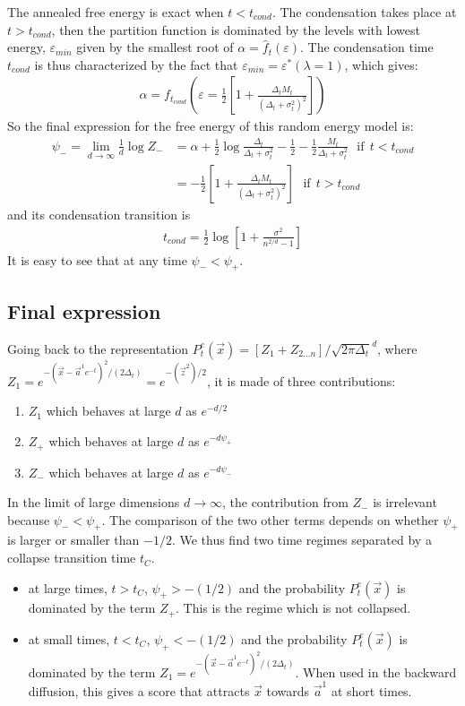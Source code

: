 \documentclass[10pt,twocolumn]{article}
\newcommand{\vx}{\vec x}
\newcommand{\va}{\vec a}
\newcommand{\ve}{{\varepsilon}}
\begin{document}
The annealed free energy is exact when $t<t_{cond}$. The condensation takes place at $t>t_{cond}$, then the partition function is dominated by the levels with lowest energy, $\ve_{min}$ given by the smallest root of 
$\alpha=\hat f_t(\ve)$. The condensation time $t_{cond}$ is  thus characterized by the fact that $\ve_{min}=\ve^*(\lambda=1)$, which gives:
\begin{align}
\alpha=f_{t_{cond}}\left( \ve=
\frac{1}{2} \left[1+\frac{\Delta_t M_t}{(\Delta_t+\sigma_t^2)^2}\right]
\right)
\end{align}
So the final expression for the free energy of this random energy model is:
\begin{align}
\psi_-=\lim_{d\to\infty} \frac{1}{d}\log Z_- &= 
\alpha+\frac{1}{2}\log\frac{\Delta_t}{\Delta_t+\sigma_t^2}-\frac{1}{2}- \frac{1}{2}\frac{M_t}{\Delta_t+\sigma_t^2}
\ \ \  \text{if}\ \  t<t_{cond}\nonumber \\
&= -\frac{1}{2} \left[1+\frac{\Delta_t M_t}{(\Delta_t+\sigma_t^2)^2}\right] \ \ \  \text{if}\ \  t>t_{cond}
\end{align}
and its condensation transition is
\begin{align}
t_{cond}=\frac{1}{2}\log\left[1+\frac{\sigma^2}{n^{2/d}-1}
\right]
\end{align}
It is easy to see that at any time $\psi_-<\psi_+$.

\subsection{Final expression}

Going back to the representation $P_t^e(\vx)= \left[Z_1+Z_{2...n}\right]/\sqrt{2\pi
  \Delta_t}^d$,
  where $Z_1= e^{-(\vx-\va^1 e^{-t})^2/(2\Delta_t)}= e^{-(\vec z^2)/2}  $, it is made of three contributions:
\begin{enumerate}
\item
$Z_1$ which behaves at large $d$ as $e^{-d/2}$
\item 
 $Z_+ $ which behaves at large $d$ as $e^{-d \psi_+}$
\item 
 $Z_- $ which behaves at large $d$ as $e^{-d \psi_-}$
\end{enumerate}

In the limit of large dimensions $d\to\infty$, the contribution from $Z_-$ is irrelevant because $\psi_-<\psi_+$. The comparison of the two other terms depends on whether $\psi_+$ is larger or smaller than $-1/2$. We thus find two time regimes separated by a collapse transition time $t_C$.
\begin{itemize}
    \item at large times, $t >t_C$, $\psi_+>-(1/2)$ and the probability $P_t^e(\vx)$ is dominated by the term $Z_+$. This is the regime which is not collapsed.
    \item at small  times, $t <t_C$, $\psi_+<-(1/2)$ and the probability $P_t^e(\vx)$ is dominated by the term $Z_1= e^{-(\vx-\va^1 e^{-t})^2/(2\Delta_t)}$. When used in the backward diffusion, this gives a score that attracts $\vx$ towards $\va^1$ at short times.
\end{itemize}
\end{document}
